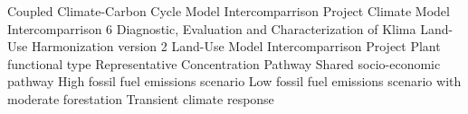 \documentclass[draft]{agujournal2019}
\begin{document}

%
%
%
%

%


\begin{acronyms}
     Coupled Climate-Carbon Cycle Model Intercomparrison Project
     Climate Model Intercomparrison 6
     Diagnostic, Evaluation and Characterization of Klima
     Land-Use Harmonization version 2
     Land-Use Model Intercomparrison Project
     Plant functional type
     Representative Concentration Pathway
     Shared socio-economic pathway
     High fossil fuel emissions scenario
     Low fossil fuel emissions scenario with moderate forestation
     Transient climate response
\end{acronyms}


\end{document}
